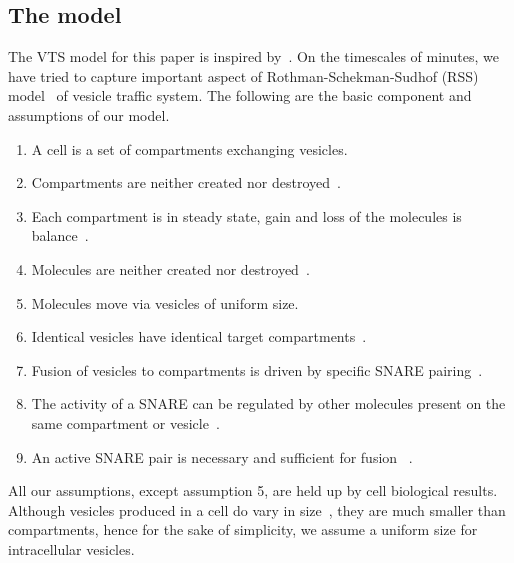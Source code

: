 \subsection{The model}
\noindent The VTS model for this paper is inspired by~\cite{shukla2017discovering}. 
%
On the timescales of minutes, we have tried to capture important aspect of Rothman-Schekman-Sudhof (RSS) model~\cite{rothman2002machinery} of vesicle traffic system.
%
The following are the basic component and assumptions of our model. 
\begin{enumerate}
\item A cell is a set of compartments exchanging vesicles.
\item Compartments are neither created nor destroyed~\cite{braell1984glycoprotein}.
\item Each compartment is in steady state, gain and loss of the molecules is balance~\cite{braell1984glycoprotein}.
\item Molecules are neither created nor destroyed~\cite{he2009differential}.
\item Molecules move via vesicles of uniform size.
\item Identical vesicles have identical target compartments~\cite{fries1981transient}.
\item Fusion of vesicles to compartments is driven by specific SNARE pairing~\cite{mcnew2000compartmental}.
\item The activity of a SNARE can be regulated by other molecules present on the same compartment or vesicle~\cite{mima2008reconstituted}.
\item An active SNARE pair is necessary and sufficient for fusion~\cite{weber1998snarepins}
. 
\end{enumerate}
%
All our assumptions, except assumption 5, are held up by cell biological results.
%
Although vesicles produced in a cell do vary in size~\cite{jena2008intracellular}, they are much smaller than compartments, hence for the sake of simplicity, we assume a uniform size for intracellular vesicles.


